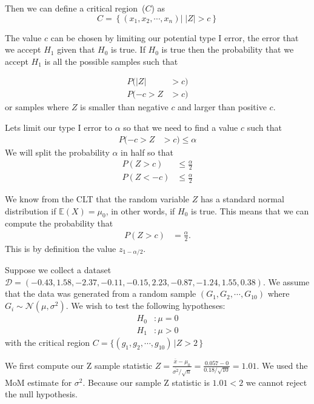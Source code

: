 Then we can define a critical region~($C$) as 
\begin{equation}
    C = \left \{ (x_{1},x_{2},\cdots,x_{n}) |\; |Z| > c \right\}
\end{equation}

The value $c$ can be chosen by limiting our potential type I error, the error that we accept $H_{1}$ given that $H_{0}$ is true. 
If $H_{0}$ is true then the probability that we accept $H_{1}$ is all the possible samples such that 

\begin{align}
      P( |Z| &> c) \\
      P(-c > Z &> c) 
\end{align}
or samples where $Z$ is smaller than negative $c$ and larger than positive $c$. 

Lets limit our type I error to $\alpha$ so that we need to find a value $c$ such that 
\begin{align}
      P(-c > Z &> c) \leq \alpha 
\end{align}
We will split the probability $\alpha$ in half so that
\begin{align}
      P( Z > c)  &\leq \frac{\alpha}{2}\\
      P( Z < -c) &\leq \frac{\alpha}{2}
\end{align}



We know from the CLT that the random variable $Z$ has a standard normal distribution if $\mathbb{E}(X) = \mu_{0}$, in other words, if $H_{0}$ is true. 
This means that we can compute the probability that 
\begin{align}
      P( Z > c)  &= \frac{\alpha}{2}.
\end{align}
This is by definition the value $z_{1-\alpha/2}$.

\ex Suppose we collect a dataset $\mathcal{D} = ( -0.43,  1.58, -2.37, -0.11, -0.15,  2.23, -0.87, -1.24,  1.55,  0.38)$. We assume that the data was generated from a random sample $(G_{1},G_{2},\cdots,G_{10})$ where $G_{i} \sim \mathcal{N}(\mu,\sigma^{2})$. We wish to test the following hypotheses: 
\begin{align}
    H_{0}&: \mu  = 0 \\ 
    H_{1}&: \mu  > 0 
\end{align}
with the critical region $C = \{ (g_{1}, g_{2}, \cdots, g_{10}) \, | Z > 2 \,  \}$

We first compute our Z sample statistic $ Z = \frac{\overline{x} - \mu_{0}}{\overline{\sigma^{2}} / \sqrt{n}} =  \frac{0.057 - 0}{ 0.18 / \sqrt{10} } = 1.01$. 
We used the MoM estimate for $\sigma^{2}$.
Because our sample Z statistic is $1.01 < 2$ we cannot reject the null hypothesis. 

